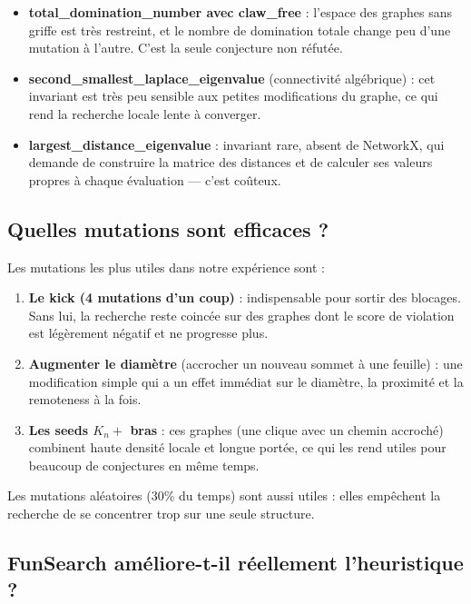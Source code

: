 \documentclass[12pt,a4paper]{article}
\begin{document}
\begin{itemize}
  \item \textbf{total\_domination\_number avec claw\_free} : l'espace des
        graphes sans griffe est très restreint, et le nombre de domination
        totale change peu d'une mutation à l'autre.  C'est la seule conjecture
        non réfutée.
  \item \textbf{second\_smallest\_laplace\_eigenvalue} (connectivité algébrique) :
        cet invariant est très peu sensible aux petites modifications du graphe,
        ce qui rend la recherche locale lente à converger.
  \item \textbf{largest\_distance\_eigenvalue} : invariant rare, absent de NetworkX,
        qui demande de construire la matrice des distances et de calculer ses
        valeurs propres à chaque évaluation — c'est coûteux.
\end{itemize}

\subsection{Quelles mutations sont efficaces ?}

Les mutations les plus utiles dans notre expérience sont :

\begin{enumerate}
  \item \textbf{Le kick (4 mutations d'un coup)} : indispensable pour sortir
        des blocages.  Sans lui, la recherche reste coincée sur des graphes
        dont le score de violation est légèrement négatif et ne progresse plus.
  \item \textbf{Augmenter le diamètre} (accrocher un nouveau sommet à une feuille) :
        une modification simple qui a un effet immédiat sur le diamètre, la
        proximité et la remoteness à la fois.
  \item \textbf{Les seeds $K_n +$ bras} : ces graphes (une clique avec un chemin
        accroché) combinent haute densité locale et longue portée, ce qui les
        rend utiles pour beaucoup de conjectures en même temps.
\end{enumerate}

Les mutations aléatoires (30\% du temps) sont aussi utiles : elles empêchent
la recherche de se concentrer trop sur une seule structure.

\subsection{FunSearch améliore-t-il réellement l'heuristique ?}
\end{document}
